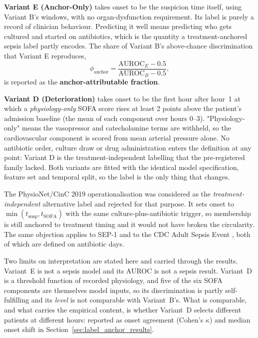 \textbf{Variant E (Anchor-Only)} takes onset to be the suspicion time itself,
using Variant B's windows, with no organ-dysfunction requirement. Its label is
purely a record of clinician behaviour. Predicting it well means predicting who
gets cultured and started on antibiotics, which is the quantity a
treatment-anchored sepsis label partly encodes. The share of Variant B's
above-chance discrimination that Variant E reproduces,
\begin{equation}
    \phi_{\text{anchor}}
    = \frac{\mathrm{AUROC}_E - 0.5}{\mathrm{AUROC}_B - 0.5},
    \label{eq:anchor_fraction}
\end{equation}
is reported as the \textbf{anchor-attributable fraction}.

\textbf{Variant D (Deterioration)} takes onset to be the first hour after hour~1
at which a \emph{physiology-only} SOFA score rises at least 2 points above the
patient's admission baseline (the mean of each component over hours 0--3).
"Physiology-only" means the vasopressor and catecholamine terms are withheld,
so the cardiovascular component is scored from mean arterial pressure alone.
No antibiotic order, culture draw or drug administration enters the definition
at any point: Variant D is the treatment-independent labelling that the
pre-registered family lacked. Both variants are fitted with the identical model
specification, feature set and temporal split, so the label is the only thing
that changes.

The PhysioNet/CinC 2019 operationalisation \cite{reyna2020utility} was
considered as the \emph{treatment-independent} alternative label and rejected
for that purpose. It sets onset to
$\min(t_{\text{susp}}, t_{\text{SOFA}})$ with the same
culture-plus-antibiotic trigger, so membership is still anchored to treatment
timing and it would not have broken the circularity. The same objection applies
to SEP-1 and to the CDC Adult Sepsis Event \cite{dutta2026performance}, both of
which are defined on antibiotic days.

Two limits on interpretation are stated here and carried through the results.
Variant~E is not a sepsis model and its AUROC is not a sepsis result. Variant~D
is a threshold function of recorded physiology, and five of the six SOFA
components are themselves model inputs, so its discrimination is partly
self-fulfilling and its \emph{level} is not comparable with Variant~B's. What
is comparable, and what carries the empirical content, is whether Variant~D
selects different patients at different hours: reported as onset agreement
(Cohen's $\kappa$) and median onset shift in
Section~\ref{sec:label_anchor_results}.

